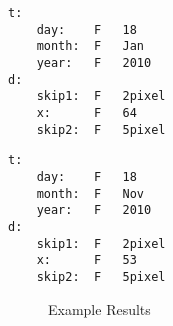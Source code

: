 
\newsavebox{\firstlisting}
\begin{lrbox}{\firstlisting}%
\begin{lstlisting}
t:
    day:    F   18
    month:  F   Jan
    year:   F   2010
d:
    skip1:  F   2pixel
    x:      F   64
    skip2:  F   5pixel
\end{lstlisting}
\end{lrbox}
\newsavebox{\secondlisting}
\begin{lrbox}{\secondlisting}
\begin{lstlisting}
t:
    day:    F   18
    month:  F   Nov
    year:   F   2010
d:
    skip1:  F   2pixel
    x:      F   53
    skip2:  F   5pixel
\end{lstlisting}
\end{lrbox}

\begin{figure}[h]
\caption{Example Results}
\subfloat[a]{
\label{fig:resub:a}
\usebox{\firstlisting}} 
\subfloat[b]{
\label{fig:resub:b}
\usebox{\secondlisting}}
\label{fig:result}
\end{figure}

